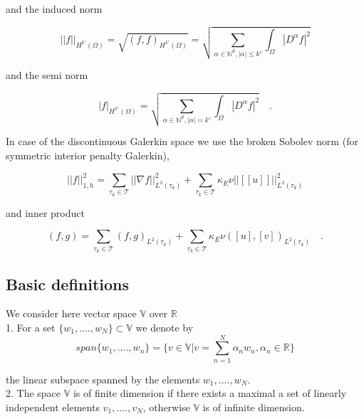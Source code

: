 \documentclass[a4paper,openany]{book}
\begin{document}
\begin{appendices}
and the induced norm 

\begin{equation}
||f||_{H^{k'} (\Omega)} = \sqrt{(f,f)_{H^{k'}(\Omega)}} = \sqrt{\sum_{\alpha \in \mathbb{N}^d, |\alpha| \leq k'} \int_\Omega |D^\alpha f|^2}
\end{equation}

and the semi norm 

\begin{equation}
|f|_{H^{k'} (\Omega)} = \sqrt{\sum_{\alpha \in \mathbb{N}^d, |\alpha| = k'} \int_\Omega |D^\alpha f|^2} \quad \textrm{.}
\end{equation}

In case of the discontinuous Galerkin space we use the broken Sobolev norm (for symmetric interior penalty Galerkin), \cite{Montlaur2}

\begin{equation}
||f||_{1,h}^2 = \sum_{\tau_k \in \mathcal{T}} ||\nabla f||_{L^2(\tau_k)}^2 + \sum_{\tau_k \in \mathcal{T}} \kappa_E \nu ||[[u]]||_{L^2 (\tau_k)}^2
\end{equation}

and inner product

\begin{equation}
(f,g) = \sum_{\tau_k \in \mathcal{T}} (f,g)_{L^2(\tau_k)} + \sum_{\tau_k \in \mathcal{T}} \kappa_E \nu ([u],[v])_{L^2 (\tau_k)} \quad \textrm{.}
\end{equation}

\subsection{Basic definitions}

We consider here vector space $\mathbb{V}$ over $\mathbb{R}$\\

1. For a set $\lbrace w_1,....,w_N \rbrace \subset \mathbb{V}$ we denote by \\
\begin{equation} \label{vector space}
span \lbrace w_1,....,w_n \rbrace = \lbrace v \in \mathbb{V} | v = \sum_{n=1}^N \alpha_n w_n, \alpha_n \in \mathbb{R} \rbrace
\end{equation} 

the linear subspace spanned by the elements $w_1,....,w_N$.\\

2. The space $\mathbb{V}$ is of finite dimension if there exists a maximal a set of linearly independent elements $v_1,....,v_N$, otherwise $\mathbb{V}$ is of infinite dimension.\\


\end{appendices}
\end{document}
